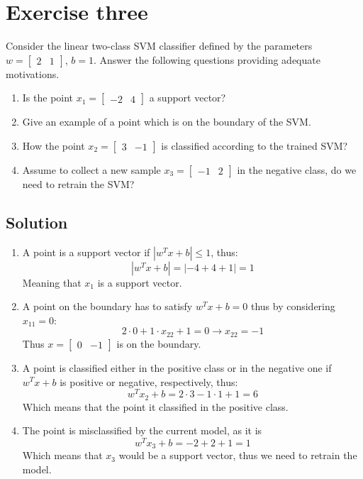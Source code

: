 \section{Exercise three}
Consider the linear two-class SVM classifier defined by the parameters $w = \begin{bmatrix} 2 & 1 \end{bmatrix}$, $b = 1$.
Answer the following questions providing adequate motivations.
\begin{enumerate}
    \item Is the point $x_1 = \begin{bmatrix} -2 & 4 \end{bmatrix}$ a support vector?
    \item Give an example of a point which is on the boundary of the SVM.
    \item How the point $x_2 = \begin{bmatrix} 3 & -1 \end{bmatrix}$ is classified according to the trained SVM?
    \item Assume to collect a new sample $x_3 = \begin{bmatrix} -1 & 2 \end{bmatrix}$ in the negative class, do we need to retrain the SVM?
\end{enumerate}

\subsection*{Solution}
\begin{enumerate}
    \item A point is a support vector if $\left\lvert w^Tx+b \right\rvert\leq 1$, thus:
        \[\left\lvert w^Tx+b \right\rvert=\left\lvert -4+4+1 \right\rvert=1\]
        Meaning that $x_1$ is a support vector.
    \item A point on the boundary has to satisfy $w^Tx+b=0$ thus by considering $x_{11}=0$:
        \[2\cdot 0+1\cdot x_{22}+1=0\rightarrow x_{22}=-1\]
        Thus $x = \begin{bmatrix} 0 & -1 \end{bmatrix}$ is on the boundary.
    \item A point is classified either in the positive class or in the negative one if $w^Tx+b$ is positive or negative, respectively, thus:
        \[w^Tx_2 + b = 2 \cdot 3 - 1 \cdot 1 + 1 = 6\]
        Which means that the point it classified in the positive class.
    \item The point is misclassified by the current model, as it is
        \[w^Tx_3+b=-2 + 2 + 1 = 1\]
        Which means that $x_3$ would be a support vector, thus we need to retrain the model.
\end{enumerate}